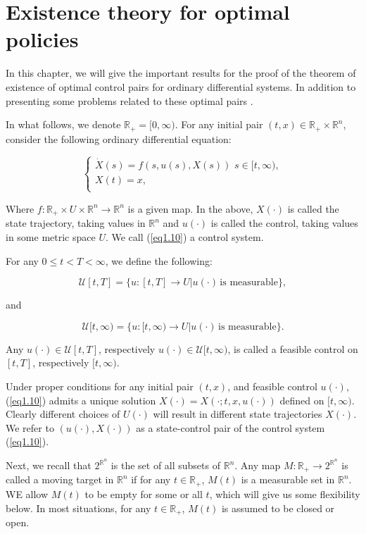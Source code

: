 \chapter{Existence theory for optimal policies}
In this chapter, we will give the important results for the proof of the theorem of existence of optimal control pairs for ordinary differential systems. In addition to presenting some problems related to these optimal pairs \cite{Yong2015}.

In what follows, we denote $\mathbb{R}_{+}=[0,\infty)$. For any initial pair $(t,x)\in \mathbb{R}_{+}\times \mathbb{R}^n$, consider the following ordinary differential equation:

\begin{equation}\label{eq1.10}
\left\{ \begin{array}{l}
\dot{X}(s)=f(s,u(s),X(s))\,\,s\in [t,\infty), \\
X(t)=x,\\
\end{array}
\right.
\end{equation}

Where $f:\mathbb{R}_{+}\times U\times \mathbb{R}^n\rightarrow \mathbb{R}^n$ is a given map. In the above, $X(\cdot)$ is called the state trajectory, taking values in $\mathbb{R}^n$ and $u(\cdot)$ is called the control, taking values in some metric space $U$. We call (\ref{eq1.10}) a control system.

For any $0\leq t<T<\infty$, we define the following:

$$\mathcal{U}[t,T]=\{u:[t,T]\rightarrow U | u(\cdot)\,\mbox{is measurable} \},$$

and 


$$\mathcal{U}[t,\infty)=\{u:[t,\infty)\rightarrow U | u(\cdot)\,\mbox{is measurable} \}.$$

Any $u(\cdot)\in \mathcal{U}[t,T]$, respectively $u(\cdot)\in \mathcal{U}[t,\infty)$, is called a feasible control on $[t,T]$, respectively $[t,\infty)$. 

Under proper conditions for any initial pair $(t,x)$, and feasible control $u(\cdot)$, (\ref{eq1.10}) admits a unique solution $X(\cdot)=X(\cdot;t,x,u(\cdot))$ defined on $[t,\infty)$. Clearly different choices of $U(\cdot)$ will result in different state trajectories $X(\cdot)$. We refer to $(u(\cdot),X(\cdot))$ as a state-control pair of the control system (\ref{eq1.10}).

Next, we recall that $2^{\mathbb{R}^n}$ is the set of all subsets of $\mathbb{R}^n$. Any map $M:\mathbb{R}_{+}\rightarrow 2^{\mathbb{R}^n}$ is called a moving target in $\mathbb{R}^n$ if for any $t\in \mathbb{R}_{+}$, $M(t)$ is a measurable set in $\mathbb{R}^n$. WE allow $M(t)$ to be empty for some or all $t$, which will give us some flexibility below. In most situations, for any $t\in\mathbb{R}_{+}$, $M(t)$ is assumed to be closed or open.

